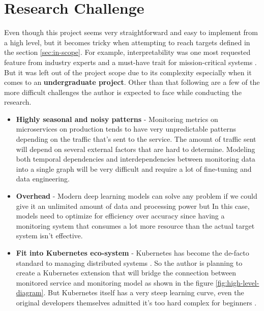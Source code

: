 
{\let\clearpage\relax\chapter{Research Challenge}}

Even though this project seems very straightforward and easy to implement from a high level, but it becomes tricky when attempting to reach targets defined in the section \ref{sec:in-scope}. For example, interpretability was one most requested feature from industry experts and a must-have trait for mission-critical systems \citep{ribeiro2016should}. But it was left out of the project scope due to its complexity especially when it comes to an \textbf{undergraduate project}. Other than that following are a few of the more difficult challenges the author is expected to face while conducting the research.\\

\begin{itemize}[leftmargin=*] 
\item \textbf{Highly seasonal and noisy patterns} - Monitoring metrics on microservices on production tends to have very unpredictable patterns depending on the traffic that's sent to the service. The amount of traffic sent will depend on several external factors that are hard to determine. Modeling both temporal dependencies and interdependencies between monitoring data into a single graph will be very difficult and require a lot of fine-tuning and data engineering.
\item \textbf{Overhead} - Modern deep learning models can solve any problem if we could give it an unlimited amount of data and processing power but In this case, models need to optimize for efficiency over accuracy since having a monitoring system that consumes a lot more resource than the actual target system isn't effective.
\item \textbf{Fit into Kubernetes eco-system} - Kubernetes has become the de-facto standard to managing distributed systems \citep{WhatisCo78:online}. So the author is planning to create a Kubernetes extension that will bridge the connection between monitored service and monitoring model as shown in the figure \ref{fig:high-level-diagram}. But Kubernetes itself has a very steep learning curve, even the original developers themselves admitted it's too hard complex for beginners \cite{Googlead4:online}.
\end{itemize}
